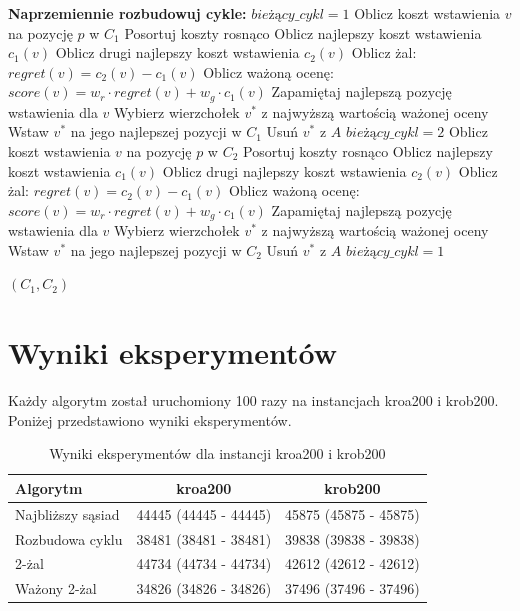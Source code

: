 \documentclass[12pt,a4paper]{article}
\begin{document}
\begin{algorithm}
\begin{algorithmic}[1]
\State \textbf{Naprzemiennie rozbudowuj cykle:}
\State $bieżący\_cykl = 1$ 
                \State Oblicz koszt wstawienia $v$ na pozycję $p$ w $C_1$
            \EndFor
            \State Posortuj koszty rosnąco
            \State Oblicz najlepszy koszt wstawienia $c_1(v)$
            \State Oblicz drugi najlepszy koszt wstawienia $c_2(v)$
            \State Oblicz żal: $regret(v) = c_2(v) - c_1(v)$
            \State Oblicz ważoną ocenę: $score(v) = w_r \cdot regret(v) + w_g \cdot c_1(v)$
            \State Zapamiętaj najlepszą pozycję wstawienia dla $v$
        \EndFor
        \State Wybierz wierzchołek $v^*$ z najwyższą wartością ważonej oceny
        \State Wstaw $v^*$ na jego najlepszej pozycji w $C_1$
        \State Usuń $v^*$ z $A$
        \State $bieżący\_cykl = 2$
    \Else
                \State Oblicz koszt wstawienia $v$ na pozycję $p$ w $C_2$
            \EndFor
            \State Posortuj koszty rosnąco
            \State Oblicz najlepszy koszt wstawienia $c_1(v)$
            \State Oblicz drugi najlepszy koszt wstawienia $c_2(v)$
            \State Oblicz żal: $regret(v) = c_2(v) - c_1(v)$
            \State Oblicz ważoną ocenę: $score(v) = w_r \cdot regret(v) + w_g \cdot c_1(v)$
            \State Zapamiętaj najlepszą pozycję wstawienia dla $v$
        \EndFor
        \State Wybierz wierzchołek $v^*$ z najwyższą wartością ważonej oceny
        \State Wstaw $v^*$ na jego najlepszej pozycji w $C_2$
        \State Usuń $v^*$ z $A$
        \State $bieżący\_cykl = 1$
    \EndIf
\EndWhile

\State \Return $(C_1, C_2)$
\end{algorithmic}
\end{algorithm}

\section{Wyniki eksperymentów}
Każdy algorytm został uruchomiony 100 razy na instancjach kroa200 i krob200. Poniżej przedstawiono wyniki eksperymentów.

\begin{table}[H]
\centering
\caption{Wyniki eksperymentów dla instancji kroa200 i krob200}
\begin{tabular}{lcc}
\toprule
\textbf{Algorytm} & \textbf{kroa200} & \textbf{krob200} \\
\midrule
Najbliższy sąsiad & 44445 (44445 - 44445) & 45875 (45875 - 45875) \\
Rozbudowa cyklu & 38481 (38481 - 38481) & 39838 (39838 - 39838) \\
2-żal & 44734 (44734 - 44734) & 42612 (42612 - 42612) \\
Ważony 2-żal & 34826 (34826 - 34826) & 37496 (37496 - 37496) \\
\bottomrule
\end{tabular}
\end{table}
\end{document}
